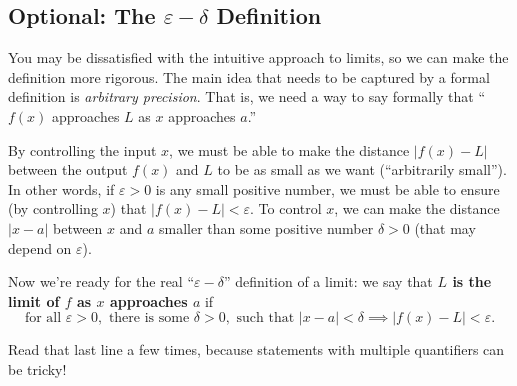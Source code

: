\subsection{Optional: The $\varepsilon-\delta$ Definition}

You may be dissatisfied with the intuitive approach to limits, so we can make the definition more rigorous. The main idea that needs to be captured by a formal definition is \textit{arbitrary precision}. That is, we need a way to say formally that ``$f(x)$ approaches $L$ as $x$ approaches $a$.''

By controlling the input $x$, we must be able to make the distance $|f(x)-L|$ between the output $f(x)$ and $L$ to be as small as we want (``arbitrarily small''). In other words, if $\varepsilon>0$ is any small positive number, we must be able to ensure (by controlling $x$) that $|f(x)-L| < \varepsilon$. To control $x$, we can make the distance $|x-a|$ between $x$ and $a$ smaller than some positive number $\delta > 0$ (that may depend on $\varepsilon$).

Now we're ready for the real ``$\varepsilon-\delta$'' definition of a limit: we say that \textbf{$L$ is the limit of $f$ as $x$ approaches $a$} if
$$\text{for all } \varepsilon > 0, \text{ there is some } \delta > 0, \text{ such that } |x - a| < \delta \implies |f(x) - L| <\varepsilon.$$

Read that last line a few times, because statements with multiple quantifiers can be tricky!

